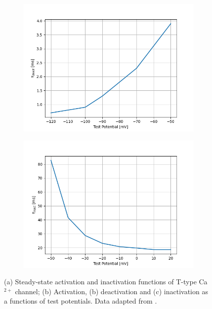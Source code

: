 \documentclass[../../workflow.tex]{subfiles}
\begin{document}
\begin{figure}[!b]
    \begin{subfigure}[t]{0.45\textwidth}
        \centering
        \includegraphics[width=\textwidth]{./img/t_type_calcium_channel/2_1_tau_r_jeong.png}
        \caption{}
    \end{subfigure}
    \hfill
    \begin{subfigure}[t]{0.45\textwidth}
        \centering
        \includegraphics[width=\textwidth]{./img/t_type_calcium_channel/2_1_tau_h_jeong.png}
        \caption{}
    \end{subfigure}
    
    \caption{
        (a) Steady-state activation and inactivation functions of T-type Ca$^{2+}$ channel;
        (b) Activation, (b) deactivation and (c) inactivation as a functions of test potentials.
        Data adapted from \parencite{jeongCaa1TFlyTtype2015}.
    }
    \label{fig:data_from_jeong}
\end{figure}
\end{document}
